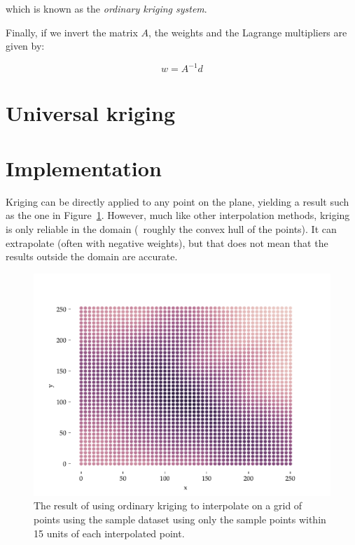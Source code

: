 which is known as the \emph{ordinary kriging system}.

Finally, if we invert the matrix \(A\), the weights and the Lagrange multipliers are given by:

\begin{equation}
w = A^{-1}d
\end{equation}

\section{Universal kriging}%

%
\section{Implementation}

Kriging can be directly applied to any point on the plane, yielding a result such as the one in Figure~\ref{fig:interpolation}.
However, much like other interpolation methods, kriging is only reliable in the domain (\ie\ roughly the convex hull of the points).
It can extrapolate (often with negative weights), but that does not mean that the results outside the domain are accurate.

\begin{figure}[htbp]
\centering
\includegraphics[width=\linewidth]{figs/interpolation}
\caption{The result of using ordinary kriging to interpolate on a grid of points using the sample dataset using only the sample points within 15 units of each interpolated point.}%
\label{fig:interpolation}
\end{figure}

